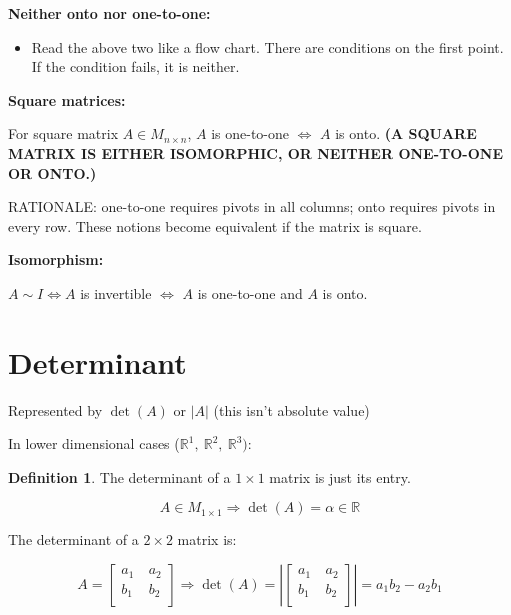 \documentclass[12pt]{article}
\theoremstyle{plain}
\theoremstyle{remark}
\theoremstyle{definition}
\newtheorem{definition}{Definition}[section]
\begin{document}
\begin{framed}
\textbf{Neither onto nor one-to-one:}

\begin{itemize}
\item
  Read the above two like a flow chart. There are conditions on the
  first point. If the condition fails, it is neither.
\end{itemize}

\textbf{Square matrices:}

For square matrix \(A \in M_{n \times n}\), \(A\) is one-to-one
\(\Leftrightarrow\) \(A\) is onto. \textbf{(A SQUARE MATRIX IS EITHER
ISOMORPHIC, OR NEITHER ONE-TO-ONE OR ONTO.)}

RATIONALE: one-to-one requires pivots in all columns; onto requires
pivots in every row. These notions become equivalent if the matrix is
square.

\textbf{Isomorphism:}

\(A\sim I \Leftrightarrow A\) is invertible \(\Leftrightarrow\) \(A\) is
one-to-one and \(A\) is onto.

\end{framed}




\section{Determinant}

Represented by \(\det(A)\) or \(|A|\) (this isn't absolute value)

In lower dimensional cases
(\(\mathbb{R}^{1},\ \mathbb{R}^{2},\ \mathbb{R}^{3})\):

\begin{definition}
The determinant of a \(1 \times 1\) matrix is just
its entry.

\[A \in M_{1 \times 1} \Rightarrow \det(A) = \alpha\mathbb{\in R}\]
\end{definition}

The determinant of a \(2 \times 2\) matrix is:

\[A = \begin{bmatrix}
a_{1}\  & a_{2} \\
b_{1} & b_{2} \\
\end{bmatrix} \Rightarrow \det(A) = \left| \begin{bmatrix}
a_{1}\  & a_{2} \\
b_{1} & b_{2} \\
\end{bmatrix} \right| = a_{1}b_{2} - a_{2}b_{1}\]
\end{document}
